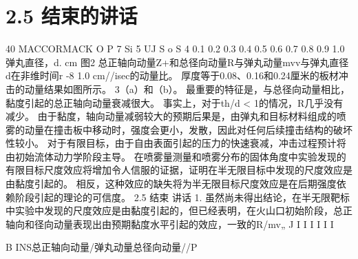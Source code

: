\documentclass[UTF8,11pt,a4paper,openany,fontset=fandol]{ctexbook}
\begin{document}
\section{2.5 结束的讲话}
40 MACCORMACK O P 7 Si 5 UJ S o S 4 0.1 0.2 0.3 0.4 0.5 0.6 0.7 0.8 0.9 1.0 弹丸直径，d. cm 图2 总正轴向动量Z+和总径向动量R与弹丸动量mvv与弹丸直径d在非维时间r -8 1.0 cm//isec的动量比。 厚度等于0.08、0.16和0.24厘米的板材冲击的动量结果如图所示。 3（a）和（b）。 最重要的特征是，与总径向动量相比，黏度引起的总正轴向动量衰减很大。 事实上，对于th/d < 1的情况，R几乎没有减少。 由于黏度，轴向动量减弱较大的预期后果是，由弹丸和目标材料组成的喷雾的动量在撞击板中移动时，强度会更小，发散，因此对任何后续撞击结构的破坏性较小。 对于有限目标，由于自由表面引起的压力的快速衰减，冲击过程预计将由初始流体动力学阶段主导。 在喷雾量测量和喷雾分布的固体角度中实验发现的有限目标尺度效应将增加令人信服的证据，证明在半无限目标中发现的尺度效应是由黏度引起的。 相反，这种效应的缺失将为半无限目标尺度效应是在后期强度依赖阶段引起的理论的可信度。 2.5 结束 讲话 1. 虽然尚未得出结论，在半无限靶标中实验中发现的尺度效应是由黏度引起的，但已经表明，在火山口初始阶段，总正轴向和径向动量表现出由预期黏度水平引起的效应，一致的R/mv„ J I I I I I I

B INS总正轴向动量/弹丸动量总径向动量//P
\end{document}
